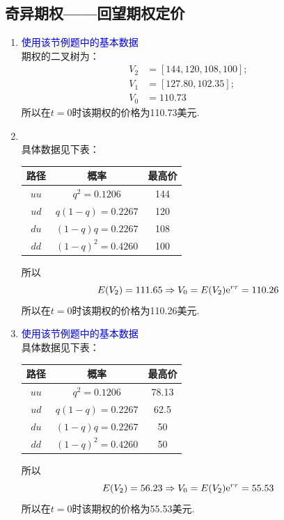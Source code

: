 \subsection{奇异期权——回望期权定价}
\begin{enumerate}
    \item \sol \textcolor{blue}{使用该节例题中的基本数据}\\
    期权的二叉树为：
    \begin{align*}
        V_2 & = [144, 120, 108, 100];\\
        V_1 & = [127.80, 102.35];\\
        V_0 & = 110.73
    \end{align*}
    所以在$t=0$时该期权的价格为110.73美元.
    \item \sol\\
    具体数据见下表：
    \begin{table}[H]
        \centering
        \begin{tabular}{|c|c|c|}
            \hline
            路径 & 概率 & 最高价 \\ \hline
            $uu$ & $q^2 = 0.1206$ & 144 \\ \hline
            $ud$ & $q(1-q) = 0.2267$ & 120 \\ \hline
            $du$ & $(1-q)q = 0.2267$ & 108 \\ \hline
            $dd$ & $(1-q)^2 = 0.4260$ & 100 \\ \hline
        \end{tabular}
    \end{table}
    所以
    \[E(V_2) = 111.65 \Rightarrow V_0 = E(V_2) \mathrm{e}^{r\tau} = 110.26\]
    所以在$t=0$时该期权的价格为110.26美元.
    \item \sol \textcolor{blue}{使用该节例题中的基本数据}\\
    具体数据见下表：
    \begin{table}[H]
        \centering
        \begin{tabular}{|c|c|c|}
            \hline
            路径 & 概率 & 最高价 \\ \hline
            $uu$ & $q^2 = 0.1206$ & 78.13 \\ \hline
            $ud$ & $q(1-q) = 0.2267$ & 62.5 \\ \hline
            $du$ & $(1-q)q = 0.2267$ & 50 \\ \hline
            $dd$ & $(1-q)^2 = 0.4260$ & 50 \\ \hline
        \end{tabular}
    \end{table}
    所以
    \[E(V_2) = 56.23 \Rightarrow V_0 = E(V_2) \mathrm{e}^{r\tau} = 55.53\]
    所以在$t=0$时该期权的价格为55.53美元.
\end{enumerate}
